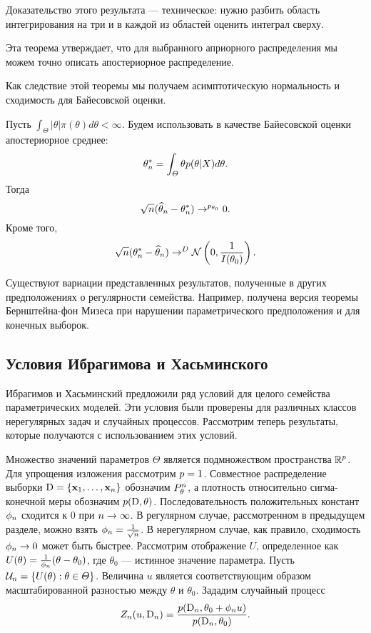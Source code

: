 Доказательство этого результата --- техническое: нужно разбить область интегрирования на три и в каждой из областей оценить интеграл сверху.

Эта теорема утверждает, что для выбранного априорного распределения мы можем точно описать апостериорное распределение.

Как следствие этой теоремы мы получаем асимптотическую нормальность и сходимость для Байесовской оценки.
\begin{Theorem}
Пусть $\int_\Theta |\theta| \pi(\theta) d\theta < \infty$. 
Будем использовать в качестве Байесовской оценки апостериорное среднее:
\[
\theta^*_n = \int_{\varTheta} \theta p(\theta | X) d\theta.
\]
Тогда
\[
\sqrt{n} (\widehat{\theta}_n - \theta^*_n) \rightarrow^{p_{\theta_0}} 0.
\]
Кроме того, 
\[
\sqrt{n} (\theta^*_n - \widehat{\theta}_n) \rightarrow^{D} \mathcal{N}\left(0, \frac{1}{I(\theta_0)}\right).
\]
\end{Theorem}

Существуют вариации представленных результатов, полученные в других предположениях о регулярности семейства.
Например, получена версия теоремы Бернштейна-фон Мизеса при нарушении параметрического предположения и для конечных выборок.

\subsection{Условия Ибрагимова и Хасьминского}

Ибрагимов и Хасьминский предложили ряд условий для целого семейства параметрических моделей.
Эти условия были проверены для различных классов нерегулярных задач и случайных процессов.
Рассмотрим теперь результаты, которые получаются с использованием этих условий.

Множество значений параметров $\Theta$ является подмножеством пространства $\mathbb{R}^{p}$.
Для упрощения изложения рассмотрим $p = 1$.
Совместное распределение выборки $\mathrm{D} = \{\mathbf{x}_1, \ldots, \mathbf{x}_{n}\}$ обозначим $P_{\theta}^{n}$, а плотность относительно сигма-конечной меры обозначим $p(\mathrm{D}, \theta)$.
Последовательность положительных констант $\phi_{n}$ сходится к $0$ при $n \rightarrow \infty$.
В регулярном случае, рассмотренном в предыдущем разделе, можно взять $\phi_{n} = \frac{1}{\sqrt{n}}$.
В нерегулярном случае, как правило, сходимость $\phi_{n} \rightarrow 0$ может быть быстрее.
Рассмотрим отображение $U$, определенное как $U(\theta) = \frac{1}{\phi_{n}} (\theta - \theta_0)$, где $\theta_0$ --- истинное значение параметра.
Пусть $\mathcal{U}_{n} = \{U(\theta): \theta \in \varTheta \}$.
Величина $u$ является соответствующим образом масштабированной разностью между $\theta$ и $\theta_0$.
Зададим случайный процесс
\[
Z_{n}(u, \mathrm{D}_{n}) = \frac{p(\mathrm{D}_{n}, \theta_0 + \phi_{n} u)}{p(\mathrm{D}_{n}, \theta_0)}.
\]

